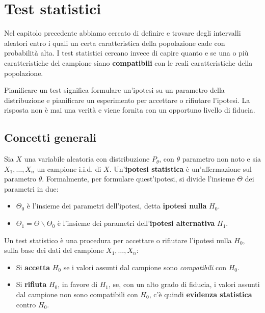 \chapter{Test statistici}

Nel capitolo precedente abbiamo cercato di definire e trovare degli intervalli
aleatori entro i quali un certa caratteristica della popolazione cade con
probabilità alta. I test statistici cercano invece di capire quanto e se una o
più caratteristiche del campione siano \textbf{compatibili} con le reali
caratteristiche della popolazione.

Pianificare un test significa formulare un'ipotesi su un parametro della
distribuzione e pianificare un esperimento per accettare o rifiutare l'ipotesi.
La risposta non è mai una verità e viene fornita con un opportuno livello di
fiducia.

\section{Concetti generali}

Sia $X$ una variabile aleatoria con distribuzione $P_\theta$, con $\theta$
parametro non noto e sia $X_1, \dots, X_n$ un campione i.i.d. di $X$.
Un'\textbf{ipotesi statistica} è un'affermazione sul parametro $\theta$.
Formalmente, per formulare quest'ipotesi, si divide l'insieme $\Theta$ dei
parametri in due:

\begin{itemize}
	\item $\Theta_0$ è l'insieme dei parametri dell'ipotesi, detta
	\textbf{ipotesi nulla} $H_0$.
	\item $\Theta_1 = \Theta \backslash \Theta_0$ è l'insieme dei parametri
	dell'\textbf{ipotesi alternativa} $H_1$.
\end{itemize}

Un test statistico è una procedura per accettare o rifiutare l'ipotesi nulla
$H_0$, sulla base dei dati del campione $X_1, \dots, X_n$:

\begin{itemize}
	\item Si \textbf{accetta} $H_0$ se i valori assunti dal campione sono
	\emph{compatibili} con $H_0$.
	\item Si \textbf{rifiuta} $H_0$, in favore di $H_1$, se, con un alto grado
	di fiducia, i valori assunti dal campione non sono compatibili con $H_0$,
	c'è quindi \textbf{evidenza statistica} contro $H_0$.
\end{itemize}

